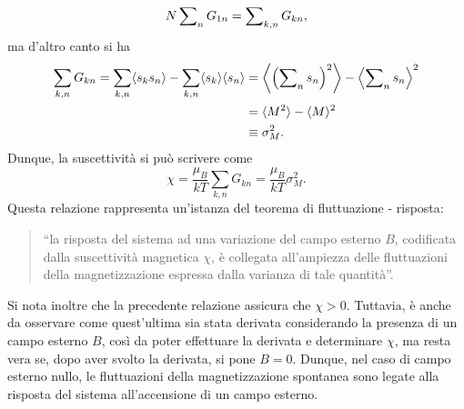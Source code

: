 \begin{equation}
    N \sum\nolimits_n G_{1n} = \sum\nolimits_{k,n} G_{kn},
\end{equation}
ma d'altro canto si ha
\begin{equation}
    \begin{split}
        \sum_{k,n} G_{kn} = \sum_{k,n} \langle s_k s_n \rangle - \sum_{k,n} \langle s_k \rangle \langle s_n \rangle &= \left\langle \left( \sum\nolimits_n s_n \right)^2 \right\rangle - \left\langle \sum\nolimits_n s_n \right\rangle^2 \\
        &= \langle M^2 \rangle - \langle M \rangle^2 \\
        &\equiv\sigma_M^2.
    \end{split}
\end{equation}
Dunque, la suscettività si può scrivere come
\begin{equation}
\label{eq: relazione suscettività - magnetizzazione}
    \chi = \frac{\mu_B}{kT}\sum_{k,n}G_{kn} = \frac{\mu_B}{kT}\sigma_M^2.
\end{equation}
Questa relazione rappresenta un'istanza del teorema di fluttuazione - risposta: 
\begin{quote}
    ``la risposta del sistema ad una variazione del campo esterno $B$, codificata dalla suscettività magnetica $\chi$, è collegata all'ampiezza delle fluttuazioni della magnetizzazione espressa dalla varianza di tale quantità''.
\end{quote}
Si nota inoltre che la precedente relazione assicura che $\chi > 0$. Tuttavia, è anche da osservare come quest'ultima sia stata derivata considerando la presenza di un campo esterno $B$, così da poter effettuare la derivata e determinare $\chi$, ma resta vera se, dopo aver svolto la derivata, si pone $B = 0$. Dunque, nel caso di campo esterno nullo, le fluttuazioni della magnetizzazione spontanea  sono legate alla risposta del sistema all'accensione di un campo esterno.

